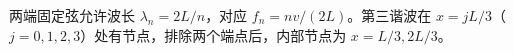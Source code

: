 两端固定弦允许波长 $\lambda_n=2L/n$，对应 $f_n=nv/(2L)$。第三谐波在 $x=jL/3$（$j=0,1,2,3$）处有节点，排除两个端点后，内部节点为 $x=L/3,2L/3$。
